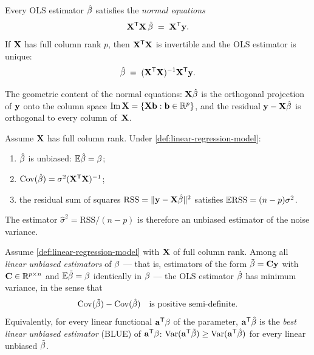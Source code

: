 \begin{theorem}
\label{thm:normal-equations}
Every OLS estimator $\hat{\mathbf{\beta}}$ satisfies the
\emph{normal equations}
\[
  \mathbf{X}^{\mathsf{T}} \mathbf{X}\, \hat{\mathbf{\beta}} \;=\; \mathbf{X}^{\mathsf{T}} \mathbf{y}.
\]
If $\mathbf{X}$ has full column rank $p$, then $\mathbf{X}^{\mathsf{T}} \mathbf{X}$ is
invertible and the OLS estimator is unique:
\[
  \hat{\mathbf{\beta}} \;=\; (\mathbf{X}^{\mathsf{T}} \mathbf{X})^{-1} \mathbf{X}^{\mathsf{T}} \mathbf{y}.
\]
\end{theorem}

The geometric content of the normal equations: $\mathbf{X} \hat{\mathbf{\beta}}$
is the orthogonal projection of $\mathbf{y}$ onto the column space
$\operatorname{Im} \mathbf{X} = \{\mathbf{X} \mathbf{b} : \mathbf{b} \in \mathbb{R}^p\}$, and the
residual $\mathbf{y} - \mathbf{X} \hat{\mathbf{\beta}}$ is orthogonal to
every column of~$\mathbf{X}$.

\begin{proposition}
\label{prop:ols-properties}
Assume $\mathbf{X}$ has full column rank. Under
\cref{def:linear-regression-model}:
\begin{enumerate}[label=(\alph*)]
  \item $\hat{\mathbf{\beta}}$ is unbiased: $\mathbb{E} \hat{\mathbf{\beta}} = \mathbf{\beta}$;
  \item $\operatorname{Cov}(\hat{\mathbf{\beta}}) = \sigma^2 (\mathbf{X}^{\mathsf{T}} \mathbf{X})^{-1}$;
  \item the residual sum of squares
        $\mathrm{RSS} = \|\mathbf{y} - \mathbf{X} \hat{\mathbf{\beta}}\|^2$
        satisfies $\mathbb{E} \mathrm{RSS} = (n - p) \sigma^2$.
\end{enumerate}
\end{proposition}

The estimator $\hat{\sigma}^2 = \mathrm{RSS}/(n - p)$ is therefore an
unbiased estimator of the noise variance.

\begin{theorem}
\label{thm:gauss-markov}
Assume \cref{def:linear-regression-model} with $\mathbf{X}$ of full
column rank. Among all \emph{linear unbiased estimators} of
$\mathbf{\beta}$ — that is, estimators of the form $\tilde{\mathbf{\beta}} = \mathbf{C} \mathbf{y}$
with $\mathbf{C} \in \mathbb{R}^{p \times n}$ and $\mathbb{E} \tilde{\mathbf{\beta}} = \mathbf{\beta}$
identically in $\mathbf{\beta}$ — the OLS estimator $\hat{\mathbf{\beta}}$
has minimum variance, in the sense that
\[
  \operatorname{Cov}(\tilde{\mathbf{\beta}}) - \operatorname{Cov}(\hat{\mathbf{\beta}}) \quad \text{is positive semi-definite.}
\]
Equivalently, for every linear functional $\mathbf{a}^{\mathsf{T}} \mathbf{\beta}$
of the parameter, $\mathbf{a}^{\mathsf{T}} \hat{\mathbf{\beta}}$ is the
\emph{best linear unbiased estimator} (BLUE) of $\mathbf{a}^{\mathsf{T}} \mathbf{\beta}$:
$\operatorname{Var}(\mathbf{a}^{\mathsf{T}} \tilde{\mathbf{\beta}}) \geq \operatorname{Var}(\mathbf{a}^{\mathsf{T}} \hat{\mathbf{\beta}})$
for every linear unbiased $\tilde{\mathbf{\beta}}$.
\end{theorem}


